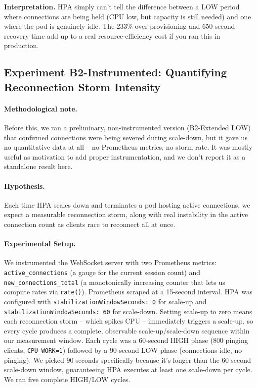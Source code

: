 \documentclass[pdflatex,sn-mathphys-num]{sn-jnl}
\theoremstyle{thmstyleone}%
\theoremstyle{thmstyletwo}%
\theoremstyle{thmstylethree}%
\begin{document}
\noindent\textbf{Interpretation.} HPA simply can't tell the difference between a
LOW period where connections are being held (CPU low, but capacity is still
needed) and one where the pod is genuinely idle. The 233\% over-provisioning and
650-second recovery time add up to a real resource-efficiency cost if you ran this
in production.

\subsection{Experiment B2-Instrumented: Quantifying Reconnection Storm Intensity}

\paragraph{Methodological note.}
Before this, we ran a preliminary, non-instrumented version (B2-Extended LOW) that
confirmed connections were being severed during scale-down, but it gave us no
quantitative data at all -- no Prometheus metrics, no storm rate. It was mostly
useful as motivation to add proper instrumentation, and we don't report it as a
standalone result here.

\paragraph{Hypothesis.} Each time HPA scales down and terminates a pod hosting
active connections, we expect a measurable reconnection storm, along with real
instability in the active connection count as clients race to reconnect all at once.

\paragraph{Experimental Setup.} We instrumented the WebSocket server with two
Prometheus metrics: \texttt{active\_connections} (a gauge for the current session
count) and \texttt{new\_connections\_total} (a monotonically increasing counter
that lets us compute rates via \texttt{rate()}). Prometheus scraped at a
15-second interval. HPA was configured with \texttt{stabilizationWindowSeconds: 0}
for scale-up and \texttt{stabilizationWindowSeconds: 60} for scale-down. Setting
scale-up to zero means each reconnection storm -- which spikes CPU -- immediately
triggers a scale-up, so every cycle produces a complete, observable
scale-up/scale-down sequence within our measurement window. Each cycle was a
60-second HIGH phase (800 pinging clients, \texttt{CPU\_WORK=1}) followed by a
90-second LOW phase (connections idle, no pinging). We picked 90 seconds
specifically because it's longer than the 60-second scale-down window, guaranteeing
HPA executes at least one scale-down per cycle. We ran five complete HIGH/LOW
cycles.
\end{document}
